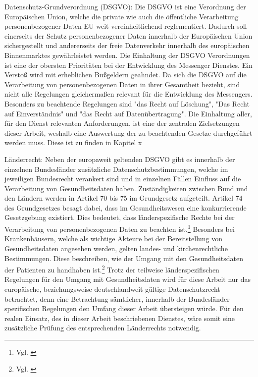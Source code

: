 Datenschutz-Grundverordnung (DSGVO): Die DSGVO ist eine Verordnung der Europäischen Union, welche die private wie auch die öffentliche Verarbeitung personenbezogener Daten EU-weit vereinheitlichend reglementiert. Dadurch soll einerseits der Schutz personenbezogener Daten innerhalb der Europäischen Union sichergestellt und andererseits der freie Datenverkehr innerhalb des europäischen Binnenmarktes gewährleistet werden. Die Einhaltung der DSGVO Verordnungen ist eine der obersten Prioritäten bei der Entwicklung des Messenger Dienstes. Ein Verstoß wird mit erheblichen Bußgeldern geahndet. Da sich die DSGVO auf die Verarbeitung von personenbezogenen Daten in ihrer Gesamtheit bezieht, sind nicht alle Regelungen gleichermaßen relevant für die Entwicklung des Messengers. Besonders zu beachtende Regelungen sind "das Recht auf Löschung", "Das Recht auf Einverständnis" und "das Recht auf Datenübertragung". Die Einhaltung aller, für den Dienst relevanten Anforderungen, ist eine der zentralen Zielsetzungen dieser Arbeit, weshalb eine Auswertung der zu beachtenden Gesetze durchgeführt werden muss. Diese ist zu finden in Kapitel x

Länderrecht: Neben der europaweit geltenden DSGVO gibt es innerhalb der einzelnen Bundesländer zusätzliche Datenschutzbestimmungen, welche im jeweiligen Bundesrecht verankert sind und in einzelnen Fällen Einfluss auf die Verarbeitung von Gesundheitsdaten haben.
Zuständigkeiten zwischen Bund und den Ländern werden in Artikel 70 bis 75 im Grundgesetz aufgeteilt. Artikel 74 des Grundgesetzes besagt dabei, dass im Gesundheitswesen eine konkurrierende Gesetzgebung existiert. Dies bedeutet, dass länderspezifische Rechte bei der Verarbeitung von personenbezogenen Daten zu beachten ist.\footnote{Vgl. \cite[S. 8]{Schubert2014}} Besonders bei Krankenhäusern, welche als wichtige Akteure bei der Bereitstellung von Gesundheitsdaten angesehen werden, gelten landes- und kirchenrechtliche Bestimmungen. Diese beschreiben, wie der Umgang mit den Gesundheitsdaten der Patienten zu handhaben ist.\footnote{Vgl. \cite[S. 21]{OrientierungshilfezumGesundheitsdatenschutz2018}}
Trotz der teilweise länderspezifischen Regelungen für den Umgang mit Gesundheitsdaten wird für diese Arbeit nur das europäische, beziehungsweise deutschlandweit gültige Datenschutzrecht betrachtet, denn eine Betrachtung sämtlicher, innerhalb der Bundesländer spezifischen Regelungen den Umfang dieser Arbeit übersteigen würde. Für den realen Einsatz, des in dieser Arbeit beschriebenen Dienstes, wäre somit eine zusätzliche Prüfung des entsprechenden Länderrechts notwendig.


